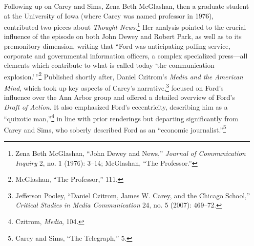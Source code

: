 \documentclass[openany,nobib]{tufte-book}
\begin{document}
Following up on Carey and Sims, Zena Beth McGlashan, then a graduate
student at the University of Iowa (where Carey was named professor in
1976), contributed two pieces about \emph{Thought News}.\footnote{Zena
  Beth McGlashan, ``John Dewey and News,'' \emph{Journal of
  Communication Inquiry} 2, no. 1 (1976): 3­--14; McGlashan, ``The
  Professor.''} Her analysis pointed to the crucial influence of the
episode on both John Dewey and Robert Park, as well as to its
premonitory dimension, writing that ``Ford was anticipating polling
service, corporate and governmental information officers, a complex
specialized press---all elements which contribute to what is called
today `the communication explosion.'\,''\footnote{McGlashan, ``The
  Professor,'' 111.} Published shortly after, Daniel Czitrom's
\emph{Media and the American Mind}, which took up key aspects of Carey's
narrative,\footnote{Jefferson Pooley, ``Daniel Czitrom, James W. Carey,
  and the Chicago School,'' \emph{Critical Studies in Media
  Communication} 24, no. 5 (2007): 469--72.} focused on Ford's influence
over the Ann Arbor group and offered a detailed overview of Ford's
\emph{Draft of Action}. It also emphasized Ford's eccentricity,
describing him as a ``quixotic man,''\footnote{Czitrom, \emph{Media},
  104.} in line with prior renderings but departing significantly from
Carey and Sims, who soberly described Ford as an ``economic
journalist.''\footnote{Carey and Sims, ``The Telegraph,'' 5.}
\end{document}
